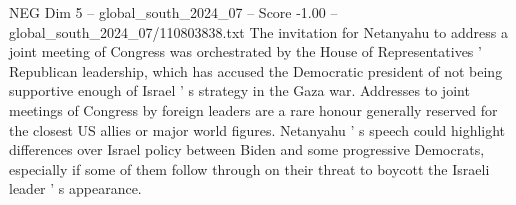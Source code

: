 \begin{textsample}{NEG Dim 5 – global\_south\_2024\_07 – Score -1.00 – global\_south\_2024\_07/110803838.txt}
The invitation for Netanyahu to address a joint meeting of Congress was orchestrated by the House of Representatives ' Republican leadership, which has accused the Democratic president of not being supportive enough of Israel ' s strategy in the Gaza war.
Addresses to joint meetings of Congress by foreign leaders are a rare honour generally reserved for the closest US allies or major world figures.
Netanyahu ' s speech could highlight differences over Israel policy between Biden and some progressive Democrats, especially if some of them follow through on their threat to boycott the Israeli leader ' s appearance.

\end{textsample}
